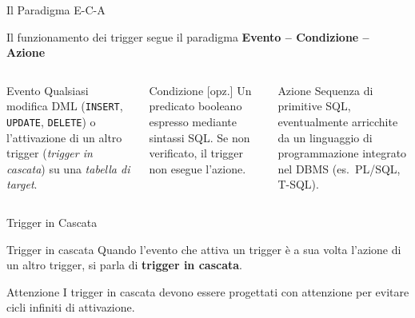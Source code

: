 \documentclass[aspectratio=169]{beamer}
\begin{document}
\begin{frame}{Il Paradigma E-C-A}
  \begin{block}{}
    Il funzionamento dei trigger segue il paradigma \textbf{Evento -- Condizione -- Azione}
  \end{block}
  \vspace{0.2cm}
  \begin{columns}[T]
      \begin{exampleblock}{\textcolor{sqlred}{Evento}}
        Qualsiasi modifica DML (\texttt{INSERT}, \texttt{UPDATE}, \texttt{DELETE})
        o l'attivazione di un altro trigger (\emph{trigger in cascata}) su una
        \emph{tabella di target}.
      \end{exampleblock}
      \begin{exampleblock}{\textcolor{sqlblue}{Condizione} \small[opz.]}
        Un predicato booleano espresso mediante sintassi SQL. Se non verificato,
        il trigger non esegue l'azione.
      \end{exampleblock}
      \begin{exampleblock}{\textcolor{sqlgreen}{Azione}}
        Sequenza di primitive SQL, eventualmente arricchite da un linguaggio di
        programmazione integrato nel DBMS (es.\ PL/SQL, T-SQL).
      \end{exampleblock}
  \end{columns}
\end{frame}

\begin{frame}{Trigger in Cascata}
  \begin{alertblock}{Trigger in cascata}
    Quando l'evento che attiva un trigger è a sua volta l'azione di un altro
    trigger, si parla di \textbf{trigger in cascata}.
  \end{alertblock}
  \vspace{0.4cm}
  \vspace{0.3cm}
  \begin{block}{Attenzione}
    I trigger in cascata devono essere progettati con attenzione per evitare
    cicli infiniti di attivazione.
  \end{block}
\end{frame}
\end{document}
